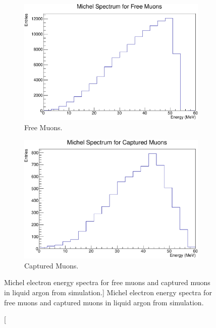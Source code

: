 \begin{figure}

	\centering
	\begin{subfigure}[b]{0.67\textwidth}
		\centering
		\includegraphics[width=\textwidth]{figures/michel_spec_free.pdf}
		\caption {Free Muons.}
		\label{fig:michel_spec_free}
	\end{subfigure}
	\begin{subfigure}[b]{0.67\textwidth}
		\centering
		\includegraphics[width=\textwidth]{figures/michel_spec_cap.pdf}
		\caption {Captured Muons.}
		\label{fig:michel_spec_cap}
	\end{subfigure}

	\caption
	[Michel electron energy spectra for free muons and captured muons in liquid
	argon from \protodune{} simulation.]
	{Michel electron energy spectra for free muons and captured muons in liquid
	argon from \protodune{} simulation.}
	\label{fig:michel_spec}

\end{figure}

